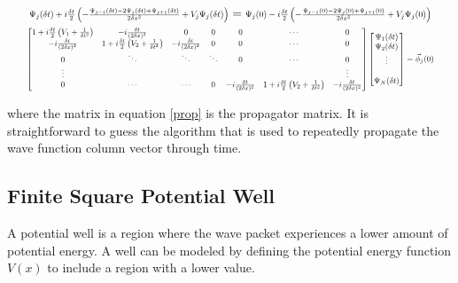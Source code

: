 \documentclass[letterpaper,12pt]{article}
\begin{document}
    \begin{gather}
        \scalebox{0.7}{$
        \Psi_j(\delta t) + i\frac{\delta t}{2}
        \left(
        -\frac{\Psi_{j-1}(\delta t)-2\Psi_j(\delta t)+\Psi_{j+1}(\delta t)}
        {2 \delta x^2}
        + V_j \Psi_j(\delta t)
        \right)
        $}
        =
        \scalebox{0.7}{$
        \Psi_j(0) - i\frac{\delta t}{2}
        \left(
        -\frac{\Psi_{j-1}(0)-2\Psi_j(0)+\Psi_{j+1}(0)}
        {2 \delta x^2}
        + V_j \Psi_j(0)
        \right)
        $}
        \nonumber
        \\
        \scalebox{0.65}{$
        \begin{bmatrix}
            1 + i\frac{\delta t}{2}\left(V_1 + \frac{1}{\delta t^2}\right)
            &
            -i\frac{\delta t}{(2 \delta x)^2} & 0 & 0 & 0 & \cdots & 0 \\
            -i\frac{\delta t}{(2 \delta x)^2}
            &
            1 + i\frac{\delta t}{2}\left(V_2 + \frac{1}{\delta t^2}\right)
            & -i\frac{\delta t}{(2 \delta x)^2} & 0 & 0 & \cdots & 0 \\
            0 & \ddots & \ddots & \ddots & 0 & \cdots & 0 \\
            \vdots & & & & & & \vdots \\
            0 & \cdots & \cdots & 0 &
            -i\frac{\delta t}{(2 \delta x)^2}
            &
            1 + i\frac{\delta t}{2}\left(V_2 + \frac{1}{\delta t^2}\right)
            & -i\frac{\delta t}{(2 \delta x)^2}
        \end{bmatrix}
        \begin{bmatrix}
            \Psi_1(\delta t) \\
            \Psi_2(\delta t) \\
            \vdots \\
            \\
            \Psi_N(\delta t)
        \end{bmatrix}
        =
        \vec{\phi}_j(0)
        $}
        \label{prop}
    \end{gather}

    where the matrix in equation \eqref{prop} is the propagator matrix. It is
    straightforward to guess the algorithm that is used to repeatedly propagate
    the wave function column vector through time.

    \subsection*{Finite Square Potential Well}
    A potential well is a region where the wave packet experiences a lower
    amount of potential energy. A well can be modeled by defining the potential
    energy function $V(x)$ to include a region with a lower value.
\end{document}
